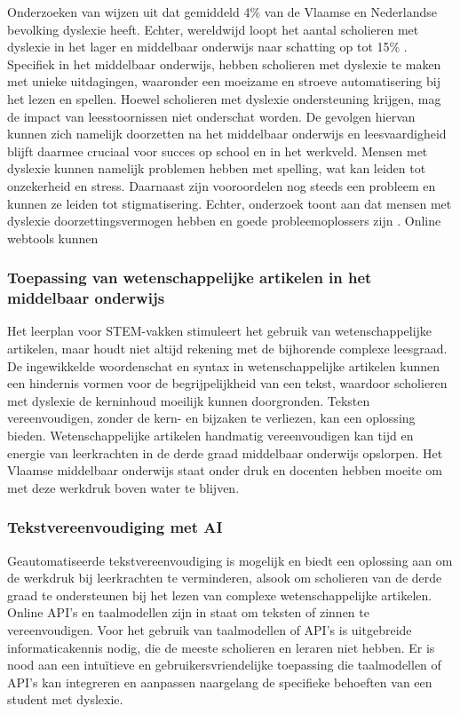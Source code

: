 Onderzoeken van \textcite{Wentink2008, Desoete2017} wijzen uit dat gemiddeld 4\% van de Vlaamse en Nederlandse bevolking dyslexie heeft. Echter, wereldwijd loopt het aantal scholieren met dyslexie in het lager en middelbaar onderwijs naar schatting op tot 15\% \autocite{Bonte2020, VanDerMeer2022}. Specifiek in het middelbaar onderwijs, hebben scholieren met dyslexie te maken met unieke uitdagingen, waaronder een moeizame en stroeve automatisering bij het lezen en spellen. Hoewel scholieren met dyslexie ondersteuning krijgen, mag de impact van leesstoornissen niet onderschat worden. De gevolgen hiervan kunnen zich namelijk doorzetten na het middelbaar onderwijs en leesvaardigheid blijft daarmee cruciaal voor succes op school en in het werkveld. Mensen met dyslexie kunnen namelijk problemen hebben met spelling, wat kan leiden tot onzekerheid en stress. Daarnaast zijn vooroordelen nog steeds een probleem en kunnen ze leiden tot stigmatisering. Echter, onderzoek toont aan dat mensen met dyslexie doorzettingsvermogen hebben en goede probleemoplossers zijn \autocite{Ghesquiere2018, Lissens2020, Bonte2020}. Online webtools kunnen

\subsubsection{Toepassing van wetenschappelijke artikelen in het middelbaar onderwijs}

Het leerplan voor STEM-vakken stimuleert het gebruik van wetenschappelijke artikelen, maar houdt niet altijd rekening met de bijhorende complexe leesgraad. De ingewikkelde woordenschat en syntax in wetenschappelijke artikelen kunnen een hindernis vormen voor de begrijpelijkheid van een tekst, waardoor scholieren met dyslexie de kerninhoud moeilijk kunnen doorgronden. Teksten vereenvoudigen, zonder de kern- en bijzaken te verliezen, kan een oplossing bieden. Wetenschappelijke artikelen handmatig vereenvoudigen kan tijd en energie van leerkrachten in de derde graad middelbaar onderwijs opslorpen. Het Vlaamse middelbaar onderwijs staat onder druk en docenten hebben moeite om met deze werkdruk boven water te blijven. 


\subsubsection{Tekstvereenvoudiging met AI}

Geautomatiseerde tekstvereenvoudiging is mogelijk en biedt een oplossing aan om de werkdruk bij leerkrachten te verminderen, alsook om scholieren van de derde graad te ondersteunen bij het lezen van complexe wetenschappelijke artikelen. Online API's en taalmodellen zijn in staat om teksten of zinnen te vereenvoudigen. Voor het gebruik van taalmodellen of API’s is uitgebreide informaticakennis nodig, die de meeste scholieren en leraren niet hebben. Er is nood aan een intuïtieve en gebruikersvriendelijke toepassing die taalmodellen of API's kan integreren en aanpassen naargelang de specifieke behoeften van een student met dyslexie.

